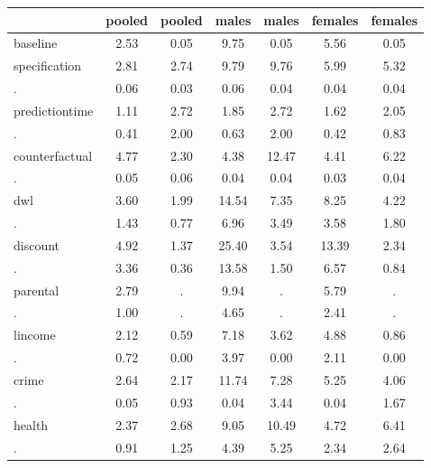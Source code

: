 \begin{table}[htbp]
\begin{tabular}{lcccccc} \hline \hline
 & pooled  & pooled  & males  & males  & females  & females  \\  \hline 
baseline &      2.53 &      0.05 &      9.75 &      0.05 &      5.56 &      0.05 \\  
specification &      2.81 &      2.74 &      9.79 &      9.76 &      5.99 &      5.32 \\  
. &      0.06 &      0.03 &      0.06 &      0.04 &      0.04 &      0.04 \\  
predictiontime &      1.11 &      2.72 &      1.85 &      2.72 &      1.62 &      2.05 \\  
. &      0.41 &      2.00 &      0.63 &      2.00 &      0.42 &      0.83 \\  
counterfactual &      4.77 &      2.30 &      4.38 &     12.47 &      4.41 &      6.22 \\  
. &      0.05 &      0.06 &      0.04 &      0.04 &      0.03 &      0.04 \\  
dwl &      3.60 &      1.99 &     14.54 &      7.35 &      8.25 &      4.22 \\  
. &      1.43 &      0.77 &      6.96 &      3.49 &      3.58 &      1.80 \\  
discount &      4.92 &      1.37 &     25.40 &      3.54 &     13.39 &      2.34 \\  
. &      3.36 &      0.36 &     13.58 &      1.50 &      6.57 &      0.84 \\  
parental &      2.79 &         . &      9.94 &         . &      5.79 &         . \\  
. &      1.00 &         . &      4.65 &         . &      2.41 &         . \\  
lincome &      2.12 &      0.59 &      7.18 &      3.62 &      4.88 &      0.86 \\  
. &      0.72 &      0.00 &      3.97 &      0.00 &      2.11 &      0.00 \\  
crime &      2.64 &      2.17 &     11.74 &      7.28 &      5.25 &      4.06 \\  
. &      0.05 &      0.93 &      0.04 &      3.44 &      0.04 &      1.67 \\  
health &      2.37 &      2.68 &      9.05 &     10.49 &      4.72 &      6.41 \\  
. &      0.91 &      1.25 &      4.39 &      5.25 &      2.34 &      2.64 \\  
\hline \hline \end{tabular}
\end{table}
